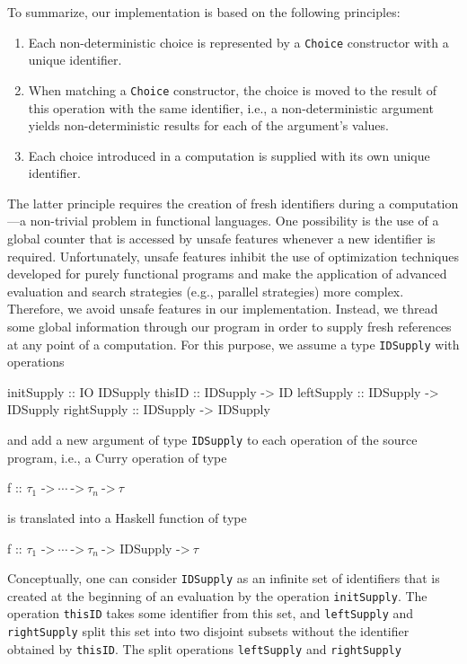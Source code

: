 \documentclass{llncs}
\newcommand{\code}[1]{\mbox{\small\texttt{#1}}}
\begin{document}
To summarize, our implementation is based on the following principles:
\begin{enumerate}
\item Each non-deterministic choice is represented by a \code{Choice}
constructor with a unique identifier.
\item When matching a \code{Choice} constructor, the choice is
moved to the result of this operation with the same identifier,
i.e., a non-deterministic argument
yields non-deterministic results for each of the argument's values.
\item Each choice introduced in a computation is supplied with its own unique
identifier.
\end{enumerate}
The latter principle requires the creation of fresh identifiers
during a computation---a non-trivial problem in functional languages.
One possibility is the use of a global counter
that is accessed by unsafe features whenever a new identifier
is required. Unfortunately, unsafe features inhibit the use
of optimization techniques developed for purely functional programs
and make the application of advanced evaluation and search
strategies (e.g., parallel strategies) more complex.
Therefore, we avoid unsafe features in our implementation.
Instead, we thread some global information
through our program in order to supply fresh references
at any point of a computation.
For this purpose, we assume a type \code{IDSupply}
with operations
\begin{haskell}
  initSupply  :: IO IDSupply
  thisID      :: IDSupply -> ID
  leftSupply  :: IDSupply -> IDSupply
  rightSupply :: IDSupply -> IDSupply
\end{haskell}
and add a new argument of type \code{IDSupply} to each operation
of the source program, i.e., a Curry operation of type
\begin{curry}
  f :: $\tau_1$ ->$~\cdots~$->$~\tau_n~$->$~\tau$
\end{curry}
is translated into a Haskell function of type
\begin{haskell}
  f :: $\tau_1$ ->$~\cdots~$->$~\tau_n~$-> IDSupply ->$~\tau$
\end{haskell}
%
Conceptually, one can consider \code{IDSupply}
as an infinite set of identifiers that is created at the beginning
of an evaluation by the operation \code{initSupply}.
The operation \code{thisID} takes some identifier from this set, and
\code{leftSupply} and \code{rightSupply} split this set
into two disjoint subsets without the identifier
obtained by \code{thisID}.
The split operations \code{leftSupply} and \code{rightSupply}
\end{document}
